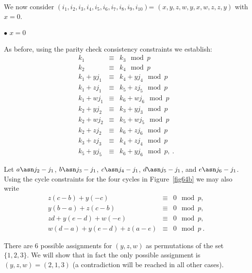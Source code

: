 


 We now consider
$(i_1,i_2,i_3,i_4,i_5,i_6,i_7,i_8,i_9,i_{10})$=
$(x,y,z,w,y,x,w,z,z,y)$ with $x=0$. 

$\bullet$ $x=0$

As before, using the parity check consistency constraints we
establish:
\begin{equation}\label{eq11c}\begin{array}{cccc}
k_1 & \equiv & k_3 \mod p\\
k_2 & \equiv & k_4 \mod p\\
k_1+yj_1 & \equiv & k_4+yj_4 \mod p\\
k_1+zj_1 & \equiv & k_5+zj_5 \mod p\\
k_1+wj_1 & \equiv & k_6+wj_6 \mod p\\
k_2+yj_2 & \equiv & k_3+yj_3 \mod p\\
k_2+wj_2 & \equiv & k_5+wj_5 \mod p\\
k_2+zj_2 & \equiv & k_6+zj_6 \mod p\\
k_3+zj_3 & \equiv & k_4+zj_4 \mod p\\
k_5+yj_5 & \equiv & k_6+yj_6 \mod p,~.
\end{array}\end{equation}

Let $a \asn j_2 -j_1$, $b \asn j_3 -j_1$, $c \asn j_4 -j_1$, $d
\asn j_5 -j_1$, and $e \asn j_6 -j_1$. Using the cycle constraints
for the four cycles in Figure~\ref{fig64b} we may also write
\begin{equation}\label{eq11d}\begin{array}{cccc}
z(c-b)+y(-c) &\equiv & 0 \mod p, \\
y(b-a)+z(c-b)&\equiv & 0 \mod p, \\
zd+y(e-d)+w(-e) &\equiv & 0 \mod p, \\
w(d-a)+y(e-d)+z(a-e) &\equiv & 0 \mod p~.
\end{array}\end{equation}


There are 6 possible assignments for $(y,z,w)$ as permutations of
the set $\{1,2,3\}$. We will show that in fact the only possible
assignment is $(y,z,w)=(2,1,3)$ (a contradiction will be reached
in all other cases).

